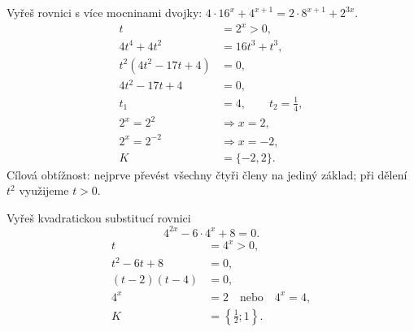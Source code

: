 \documentclass[11pt,a4paper]{article}
\begin{document}
\begin{prikladReseniBox}[title={Příklad 4}]
Vyřeš rovnici s více mocninami dvojky: $4\cdot16^x+4^{x+1}=2\cdot8^{x+1}+2^{3x}$.
\tcblower
\[
\begin{aligned}t&=2^x>0,\\4t^4+4t^2&=16t^3+t^3,\\t^2(4t^2-17t+4)&=0,\\4t^2-17t+4&=0,\\t_1&=4,\qquad t_2=\frac{1}{4},\\2^x=2^2&\Rightarrow x=2,\\2^x=2^{-2}&\Rightarrow x=-2,\\K&=\{-2,2\}.\end{aligned}
\]
Cílová obtížnost: nejprve převést všechny čtyři členy na jediný základ; při dělení $t^2$ využijeme $t>0$.
\end{prikladReseniBox}
\begin{prikladReseniBox}[title={Příklad 5}]
Vyřeš kvadratickou substitucí rovnici
\[
4^{2x}-6\cdot4^x+8=0.
\]
\tcblower
\[
\begin{aligned}
t&=4^x>0,\\t^2-6t+8&=0,\\(t-2)(t-4)&=0,\\4^x&=2\quad\text{nebo}\quad4^x=4,\\K&=\left\{\frac{1}{2};1\right\}.
\end{aligned}
\]
\end{prikladReseniBox}
\end{document}
